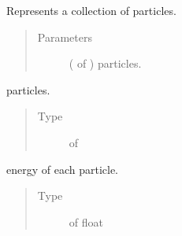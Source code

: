 \documentclass[letterpaper,10pt,english]{sphinxmanual}
\begin{document}
\begin{fulllineitems}
\label{\detokenize{code_structure:scdc.particle.ParticleCollection}}
Represents a collection of particles.
\begin{quote}\begin{description}
\item[{Parameters}] \leavevmode
{} ( of {\hyperref[\detokenize{code_structure:scdc.particle.Particle}]{}}) \textendash{} particles.

\end{description}\end{quote}

\begin{fulllineitems}
\label{\detokenize{code_structure:scdc.particle.ParticleCollection.particles}}
particles.
\begin{quote}\begin{description}
\item[{Type}] \leavevmode
{} of {\hyperref[\detokenize{code_structure:scdc.particle.Particle}]{}}

\end{description}\end{quote}

\end{fulllineitems}


\begin{fulllineitems}
\label{\detokenize{code_structure:scdc.particle.ParticleCollection.energy}}
energy of each particle.
\begin{quote}\begin{description}
\item[{Type}] \leavevmode
{} of float


\end{description}
\end{quote}
\end{fulllineitems}
\end{fulllineitems}
\end{document}
